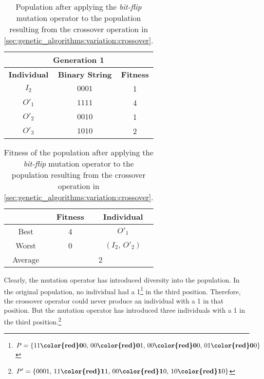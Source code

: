   \begin{table}[ht!]
    \centering
    \begin{tabular}{c | c | c }
      \multicolumn{3}{c}{\textbf{Generation 1}} \\
      \hline
      \hline
      \textbf{Individual} & \textbf{Binary String}  & \textbf{Fitness} \\
      \hline
      \(I_2\)             & \(0001\)                & 1 \\
      \(O'_1\)            & \(1111\)                & 4 \\
      \(O'_2\)            & \(0010\)                & 1 \\
      \(O'_3\)            & \(1010\)                & 2
    \end{tabular}
    \caption{
      Population after applying the \emph{bit-flip} mutation operator to the 
      population resulting from the crossover operation in 
      \vref{sec:genetic_algorithms:variation:crossover}.
    }
    \label{tab:genetic_algorithms:variation:mutation:2}
  \end{table}

  \begin{table}[H]
    \centering
    \begin{tabular}{|c|c|c|}
      \hline
            & \textbf{Fitness} & \textbf{Individual}  \\
      \hline
      Best  & 4 & \(O'_1\) \\
      Worst & 0 & \((I_2,\, O'_2)\) \\
      \hline
      \hline
      Average & \multicolumn{2}{c|}{2} \\
      \hline
    \end{tabular}
    \caption{
      Fitness of the population after applying the \emph{bit-flip} mutation 
      operator to the population resulting from the crossover operation in
      \vref{sec:genetic_algorithms:variation:crossover}.
    }
    \label{tab:genetic_algorithms:variation:mutation:fitness}
  \end{table}
 
  Clearly, the mutation operator has introduced diversity into the population.
  In the original population, no individual had a 1\footnote{
    \(P = \{
      11\textbf{{\color{red}0}}0,\, 
      00\textbf{{\color{red}0}}1,\, 
      00\textbf{{\color{red}0}}0,\, 
      01\textbf{{\color{red}0}}0
    \}\)
  } in the third position.
  Therefore, the crossover operator could never produce an individual with a 1 
  in that position.
  But the mutation operator has introduced three individuals with a 1 in the 
  third position.\footnote{
    \(P' = \{
      0001,\, 
      11\textbf{{\color{red}1}}1,\, 
      00\textbf{{\color{red}1}}0,\, 
      10\textbf{{\color{red}1}}0
    \}\)
  } 


